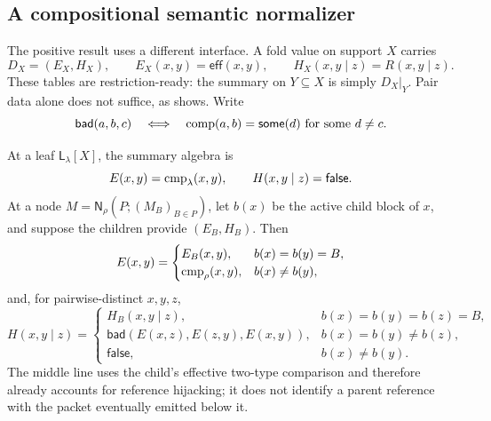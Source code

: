 \subsection{A compositional semantic normalizer}

The positive result uses a different interface.  A fold value on support
\(X\) carries
\begin{equation}
 D_X=(E_X,H_X),\qquad
 E_X(x,y)=\mathsf{eff}(x,y),\qquad
 H_X(x,y\mid z)=R(x,y\mid z).
 \label{eq:bottom-up-summary}
\end{equation}
These tables are restriction-ready: the summary on \(Y\subseteq X\) is
simply \(D_X|_Y\).  Pair data alone does not suffice, as
 shows.  Write
\[
 \mathsf{bad}(a,b,c)
 \quad\Longleftrightarrow\quad
 \operatorname{comp}(a,b)=\mathsf{some}(d)
 \text{ for some }d\ne c.
\]

At a leaf \(\mathsf L_\lambda[X]\), the summary algebra is
\begin{equation}
 E(x,y)=\operatorname{cmp}_\lambda(x,y),
 \qquad H(x,y\mid z)=\mathsf{false}.
 \label{eq:bottom-up-leaf-summary}
\end{equation}
At a node
\(M=\mathsf N_\rho(P;(M_B)_{B\in P})\), let \(b(x)\) be the active child
block of \(x\), and suppose the children provide \((E_B,H_B)\).  Then
\begin{equation}
 E(x,y)=
 \begin{cases}
  E_B(x,y),&b(x)=b(y)=B,\\
  \operatorname{cmp}_\rho(x,y),&b(x)\ne b(y),
 \end{cases}
 \label{eq:bottom-up-node-E}
\end{equation}
and, for pairwise-distinct \(x,y,z\),
\begin{equation}
 H(x,y\mid z)=
 \begin{cases}
  H_B(x,y\mid z),&b(x)=b(y)=b(z)=B,\\
  \mathsf{bad}(E(x,z),E(z,y),E(x,y)),
    &b(x)=b(y)\ne b(z),\\
  \mathsf{false},&b(x)\ne b(y).
 \end{cases}
 \label{eq:bottom-up-node-H}
\end{equation}
The middle line uses the child's effective two-type comparison and therefore
already accounts for reference hijacking; it does not identify a parent
reference with the packet eventually emitted below it.

